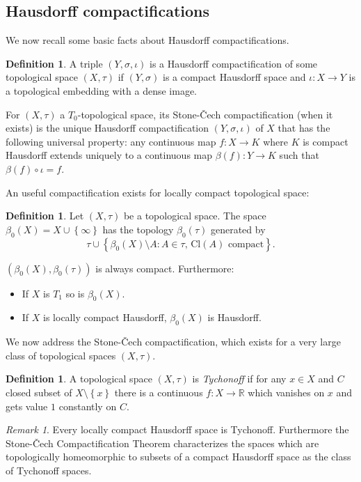 \documentclass[11pt]{amsart}
\theoremstyle{plain}
\theoremstyle{definition}
\newtheorem{definition}[theorem]{Definition}
\theoremstyle{plain}
\theoremstyle{remark}
\newtheorem{remark}[theorem]{Remark}
\newcommand{\Cl}[1]{\mathrm{Cl}\left(#1\right)}
\newcommand{\cp}[1]{\left( #1 \right)}
\newcommand{\bp}[1]{\left\lbrace #1 \right\rbrace}
\newcommand{\0}{\mathsf{0}}
\renewcommand{\1}{\mathsf{1}}
\renewcommand{\2}{\mathsf{2}}
\theoremstyle{definition}
\begin{document}
\subsection{Hausdorff compactifications}

We now recall some basic facts about Hausdorff compactifications. 

\begin{definition}
A triple $\cp{Y, \sigma,\iota}$  is a Hausdorff compactification of some topological space $(X,\tau)$ if 
$(Y,\sigma)$ is a compact Hausdorff space and $\iota:X\to Y$ is a topological embedding with a dense image.

For $(X, \tau)$ a $T_0$-topological space, its Stone-\v{C}ech compactification (when it exists) is the unique Hausdorff compactification $\cp{Y,\sigma,\iota}$ of $X$
that has the following universal property: any continuous map $f:X\to K$ where $K$ is compact Hausdorff extends uniquely to a continuous map $\beta(f):Y\to K$ such that $\beta(f)\circ\iota=f$.
\end{definition}

An useful compactification exists for locally compact topological space:
\begin{definition}
\label{def:onepointcomp}
Let $(X,\tau)$ be a topological space. The space $\beta_0(X)=X\cup\bp{\infty}$ has the topology $\beta_0(\tau)$ generated by 
\[
\tau\cup \bp{\beta_0(X)\setminus A: A\in\tau,\, \Cl{A}\text{ compact}}.
\]
\end{definition}
$(\beta_0(X),\beta_0(\tau))$ is always compact. Furthermore:
\begin{itemize}
\item
If $X$ is $T_1$ so is $\beta_0(X)$.
\item
If $X$ is locally compact Hausdorff, $\beta_0(X)$ is Hausdorff.
\end{itemize}

We now address the Stone-\v{C}ech compactification, which exists for a very large class of topological spaces $(X, \tau)$.

\begin{definition}
A topological space $(X,\tau)$ is \emph{Tychonoff} if for any $x\in X$ and $C$ closed subset of $X\setminus\bp{x}$ there is a continuous $f:X\to\mathbb{R}$ which vanishes on $x$ and gets value $1$ constantly on $C$.
\end{definition}


\begin{remark}
Every locally compact Hausdorff space is Tychonoff. Furthermore the Stone-\v{C}ech Compactification Theorem characterizes the spaces which are topologically homeomorphic to subsets of a compact Hausdorff space as the class of Tychonoff spaces. 
\end{remark}
\end{document}

